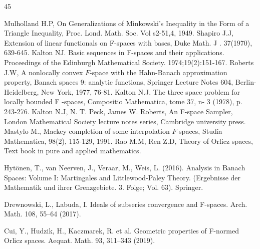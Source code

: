\documentclass[pdflatex,sn-mathphys-num]{sn-jnl}%
\theoremstyle{thmstyleone}%
\theoremstyle{thmstyletwo}%
\theoremstyle{thmstylethree}%
\begin{document}
\begin{thebibliography}{45}

 Mulholland H.P, On Generalizations of Minkowski's Inequality in the Form of a Triangle Inequality, Proc. Lond. Math. Soc. Vol s2-51,4, 1949.
Shapiro J.J, Extension of linear functionals on F-spaces with
bases, Duke Math. J . 37(1970), 639-645.
 Kalton NJ. Basic sequences in F-spaces and their applications. Proceedings of the Edinburgh Mathematical Society. 1974;19(2):151-167.
Roberts J.W, A nonlocally convex $F$-space with the Hahn-Banach
approximation property, Banach spaces 9: analytic functions, Springer Lecture Notes 604, Berlin- Heidelberg, New York,
1977, 76-81.
Kalton N.J.
The three space problem for locally bounded F -spaces,
Compositio Mathematica, tome 37, n- 3 (1978), p. 243-276. 
  Kalton N.J, N. T. Peck, James W. Roberts, An F-space Sampler, London Mathematical Society lecture notes series, Cambridge university press.
Mastylo M., Mackey completion of some interpolation $F$-spaces, Studia Mathematica, 98(2), 115-129, 1991.
 Rao M.M, Ren Z.D, Theory of Orlicz spaces, Text book in pure and applied mathematics.

 Hytönen, T., van Neerven, J., Veraar, M., Weis, L. (2016). Analysis in Banach Spaces: Volume I: Martingales and Littlewood-Paley Theory. (Ergebnisse der Mathematik und ihrer Grenzgebiete. 3. Folge; Vol. 63). Springer.

 Drewnowski, L., Labuda, I. Ideals of subseries convergence and F-spaces. Arch. Math. 108, 55–64 (2017).

 Cui, Y., Hudzik, H., Kaczmarek, R. et al. Geometric properties of F-normed Orlicz spaces. Aequat. Math. 93, 311–343 (2019).

\end{thebibliography}
\end{document}
